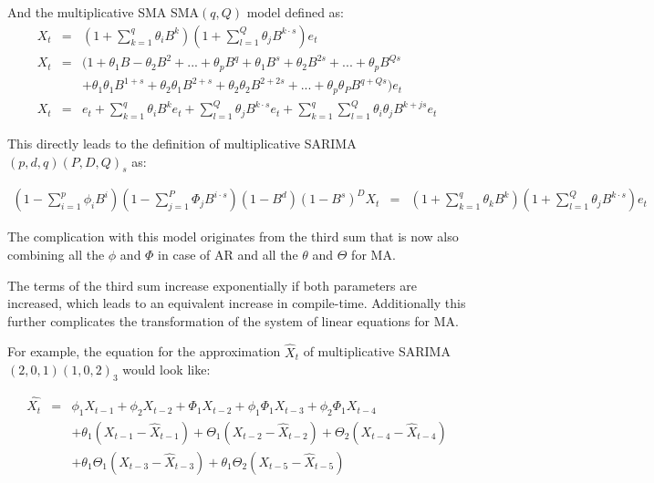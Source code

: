 And the multiplicative \acl{SMA} \acs{SMA}$(q,Q)$ model defined as:
\begin{equation}\label{eq:multiplicative_SMA_qQ}
\begin{array}{rcl}
X_t & = & (1+\displaystyle\sum_{k=1}^{q} \theta_i B^k) (1+\displaystyle\sum_{l=1}^{Q} \theta_j B^{k\cdot s}) e_t\\
X_t & = & (1+\theta_1 B-\theta_2 B^2 + ... +\theta_p B^q +\theta_1 B^s+\theta_2 B^{2s} + ... +\theta_p B^{Qs} \\
& & + \theta_1 \theta_1 B^{1+s} + \theta_2 \theta_1 B^{2+s} + \theta_2 \theta_2 B^{2+2s} + ... + \theta_p \theta_P B^{q+Qs}) e_t\\
X_t & = & e_t + \displaystyle\sum_{k=1}^{q} \theta_i B^k e_t + \displaystyle\sum_{l=1}^{Q} \theta_j B^{k\cdot s} e_t + \displaystyle\sum_{k=1}^{q}\displaystyle\sum_{l=1}^{Q} \theta_i \theta_j B^{k + js} e_t
\end{array}  
\end{equation}

This directly leads to the definition of multiplicative \acs{SARIMA}$(p,d,q)(P,D,Q)_s$ as:

\begin{equation}\label{eq:multiplicative_SARIMA}
\begin{array}{rcl}
(1-\displaystyle\sum_{i=1}^{p} \phi_i B^i)(1-\displaystyle\sum_{j=1}^{P} \Phi_j B^{i\cdot s}) (1-B^d) (1-B^s)^D X_t & = & (1+\displaystyle\sum_{k=1}^{q} \theta_k B^k) (1+\displaystyle\sum_{l=1}^{Q} \theta_j B^{k\cdot s}) e_t
\end{array}
\end{equation}

The complication with this model originates from the third sum that is now also combining  all the $\phi$ and $\Phi$ in case of \acs{AR} and all the $\theta$ and $\Theta$ for \acs{MA}.

The terms of the third sum increase exponentially if both parameters are increased, which leads to an equivalent increase in compile-time. Additionally this further complicates the transformation of the system of linear equations for \acl{MA}.

For example, the equation for the approximation ${\hat{X}}_t$ of multiplicative \acs{SARIMA}$(2,0,1)(1,0,2)_{3}$ would look like:

\begin{equation}\label{eq:example_multiplicative_SARIMA_1}
\begin{array}{rcl}
\hat{X_t} & = & \phi_1 X_{t-1} + \phi_2 X_{t-2} + \Phi_1 X_{t-2} + \phi_1 \Phi_1 X_{t-3} + \phi_2 \Phi_1 X_{t-4}\\
&& + \theta_1 (X_{t-1} - {\hat{X}}_{t-1})+ \Theta_1 (X_{t-2} - {\hat{X}}_{t-2}) + \Theta_2 (X_{t-4} - {\hat{X}}_{t-4})\\
&& + \theta_1 \Theta_1 (X_{t-3} - {\hat{X}}_{t-3}) + \theta_1 \Theta_2 (X_{t-5} - {\hat{X}}_{t-5})
\end{array}
\end{equation}

